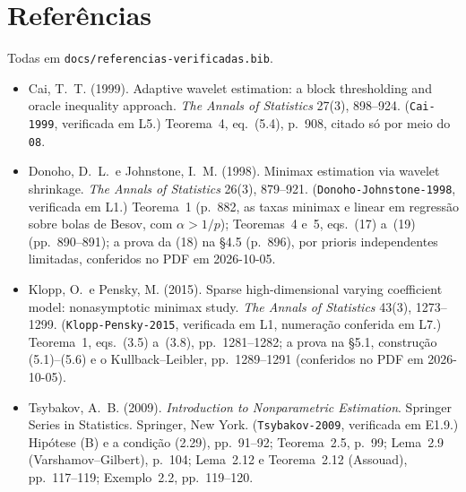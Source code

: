 \documentclass[11pt,a4paper]{article}
\begin{document}
\section*{Referências}
\sloppy

Todas em \texttt{docs/referencias-verificadas.bib}.

\begin{itemize}[nosep, leftmargin=*]
  \item Cai, T.~T. (1999). Adaptive wavelet estimation: a block thresholding
    and oracle inequality approach. \emph{The Annals of Statistics} 27(3),
    898--924. (\texttt{Cai-1999}, verificada em L5.) Teorema~4, eq.~(5.4),
    p.~908, citado só por meio do \texttt{08}.
  \item Donoho, D.~L.\ e Johnstone, I.~M. (1998). Minimax estimation via
    wavelet shrinkage. \emph{The Annals of Statistics} 26(3), 879--921.
    (\texttt{Donoho-Johnstone-1998}, verificada em L1.) Teorema~1 (p.~882,
    as taxas minimax e linear em regressão sobre bolas de Besov, com
    $\alpha > 1/p$); Teoremas~4 e~5, eqs.~(17) a~(19) (pp.~890--891); a prova
    da (18) na §4.5 (p.~896), por prioris independentes limitadas, conferidos
    no PDF em 2026-10-05.
  \item Klopp, O.\ e Pensky, M. (2015). Sparse high-dimensional varying
    coefficient model: nonasymptotic minimax study. \emph{The Annals of
    Statistics} 43(3), 1273--1299. (\texttt{Klopp-Pensky-2015}, verificada em
    L1, numeração conferida em L7.) Teorema~1, eqs.~(3.5) a~(3.8),
    pp.~1281--1282; a prova na §5.1, construção (5.1)--(5.6) e o
    Kullback--Leibler, pp.~1289--1291 (conferidos no PDF em 2026-10-05).
  \item Tsybakov, A.~B. (2009). \emph{Introduction to Nonparametric
    Estimation}. Springer Series in Statistics. Springer, New York.
    (\texttt{Tsybakov-2009}, verificada em E1.9.) Hipótese (B) e a condição
    (2.29), pp.~91--92; Teorema~2.5, p.~99; Lema~2.9 (Varshamov--Gilbert),
    p.~104; Lema~2.12 e Teorema~2.12 (Assouad), pp.~117--119; Exemplo~2.2,
    pp.~119--120.
\end{itemize}
\end{document}
